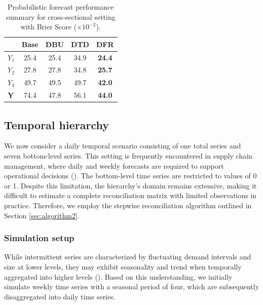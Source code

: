 \documentclass[a4paper,review,12pt,authoryear]{elsarticle}
\newcommand{\bY}{\mathbf{Y}}
\theoremstyle{definition}
\begin{document}
    \begin{table}
      \centering
      \caption{\label{tab:sim_crosssectional_res_dist} Probabilistic forecast performance summary for cross-sectional setting with Brier Score ($\times 10^{-2}$).}
      \begin{tabular}{lcccc}
      \toprule
      & Base & DBU & DTD & DFR \\\midrule
      $Y_1$ & 25.4 & 25.4 & 34.9 & \textbf{24.4} \\
      $Y_2$ & 27.8 & 27.8 & 34.8 & \textbf{25.7}\\
      $Y_3$ & 49.7 & 49.5 & 49.7 & \textbf{42.0} \\
      $\bY$ & 74.4 & 47.8 & 56.1 & \textbf{44.0} \\
      \bottomrule
      \end{tabular}
    \end{table}


     \subsection{Temporal hierarchy}

     We now consider a daily temporal scenario consisting of one total series and seven bottom-level series.
     This setting is frequently encountered in supply chain management, where daily and weekly forecasts are required to support operational decisions (\citealp{syntetosSupplyChainForecasting2016}).
     The bottom-level time series are restricted to values of 0 or 1.
     Despite this limitation, the hierarchy's domain remains extensive, making it difficult to estimate a complete reconciliation matrix with limited observations in practice.
     Therefore, we employ the stepwise reconciliation algorithm outlined in Section \ref{sec:algorithm2}.

     \subsubsection{Simulation setup}

     While intermittent series are characterized by fluctuating demand intervals and size at lower levels, they may exhibit seasonality and trend when temporally aggregated into higher levels ().
     Based on this understanding, we initially simulate weekly time series with a seasonal period of four, which are subsequently disaggregated into daily time series.
\end{document}
